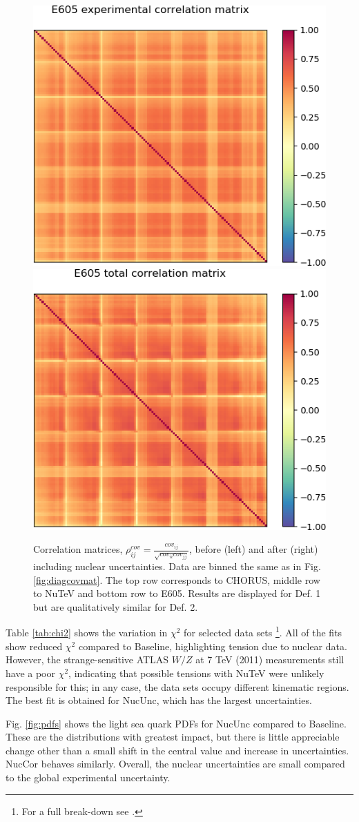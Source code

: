 \begin{figure}
\includegraphics[width=0.45\linewidth]{nuclear/corrplot_exp_DYE605_def1.png}
\includegraphics[width=0.45\linewidth]{nuclear/corrplot_tot_DYE605_def1.png}
      \caption{Correlation matrices, $\rho^{cov}_{ij} = \frac{cov_{ij}}{\sqrt{cov_{ii}cov_{jj}}}$, before (left) and after (right) including nuclear uncertainties. Data are binned the same as in Fig. \ref{fig:diagcovmat}. The top row corresponds to CHORUS, middle row to NuTeV and bottom row to E605. Results are displayed for Def. 1 but are qualitatively similar for Def. 2. \label{fig:corrmats}}
\end{figure}

Table \ref{tab:chi2} shows the variation in $\chi^2$ for selected data sets \footnote{For a full break-down see \cite{Ball:2018odr}.}. All of the fits show reduced $\chi^2$ compared to Baseline, highlighting tension due to nuclear data. However, the strange-sensitive ATLAS $W/Z$ at 7 TeV (2011) measurements \cite{Aad:2011dm} still have a poor $\chi^2$, indicating that possible tensions with NuTeV were unlikely responsible for this; in any case, the data sets occupy different kinematic regions. The best fit is obtained for NucUnc, which has the largest uncertainties.

Fig. \ref{fig:pdfs} shows the light sea quark PDFs for NucUnc compared to Baseline. These are the distributions with greatest impact, but there is little appreciable change other than a small shift in the central value and increase in uncertainties. NucCor behaves similarly. Overall, the nuclear uncertainties are small compared to the global experimental uncertainty.

